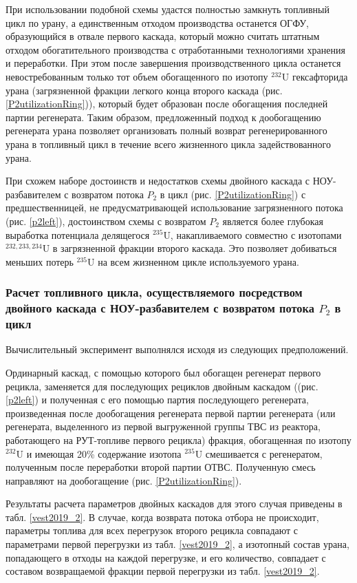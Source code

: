 При использовании подобной схемы удастся полностью замкнуть топливный цикл по урану, а единственным отходом производства останется ОГФУ, образующийся в отвале первого каскада, который можно считать штатным отходом обогатительного производства с отработанными технологиями хранения и переработки. При этом после завершения производственного цикла останется невостребованным только тот объем обогащенного по изотопу $^{232}$U гексафторида урана (загрязненной фракции легкого конца второго каскада (рис. \ref{P2utilizationRing})), который будет образован после обогащения последней партии регенерата. Таким образом, предложенный подход к дообогащению регенерата урана позволяет организовать полный возврат регенерированного урана в топливный цикл в течение всего жизненного цикла задействованного урана.

При схожем наборе достоинств и недостатков схемы двойного каскада с НОУ-разбавителем с возвратом потока $P_2$ в цикл (рис. \ref{P2utilizationRing}) с предшественницей, не предусматривающей использование загрязненного потока (рис. \ref{p2left}), достоинством схемы с возвратом $P_2$ является более глубокая выработка потенциала делящегося $^{235}$U, накапливаемого совместно с изотопами $^{232,233,234}$U в загрязненной фракции второго каскада. Это позволяет добиваться меньших потерь $^{235}$U на всем жизненном цикле используемого урана.


\subsubsection{Расчет топливного цикла, осуществляемого посредством двойного каскада с НОУ-разбавителем с возвратом потока $P_2$ в цикл}

Вычислительный эксперимент выполнялся исходя из следующих предположений.

Ординарный каскад, с помощью которого был обогащен регенерат первого рецикла, заменяется для последующих рециклов двойным каскадом ((рис. \ref{p2left}) и  полученная с его помощью партия последующего регенерата, произведенная после дообогащения регенерата первой партии регенерата (или регенерата, выделенного из первой выгруженной группы ТВС из реактора, работающего на РУТ-топливе первого рецикла) фракция, обогащенная по изотопу $^{232}$U и имеющая 20\% содержание изотопа $^{235}$U смешивается с регенератом, полученным после переработки второй партии ОТВС. Полученную смесь направляют на дообогащение (рис. \ref{P2utilizationRing}).


Результаты расчета параметров двойных каскадов для этого случая приведены в табл. \ref{vest2019_2}. В случае, когда возврата потока отбора не происходит, параметры топлива для всех перегрузок второго рецикла совпадают с параметрами первой перегрузки из табл. \ref{vest2019_2}, а изотопный состав урана, попадающего в отходы на каждой перегрузке, и его количество, совпадает с составом возвращаемой фракции первой перегрузки из табл. \ref{vest2019_2}.

